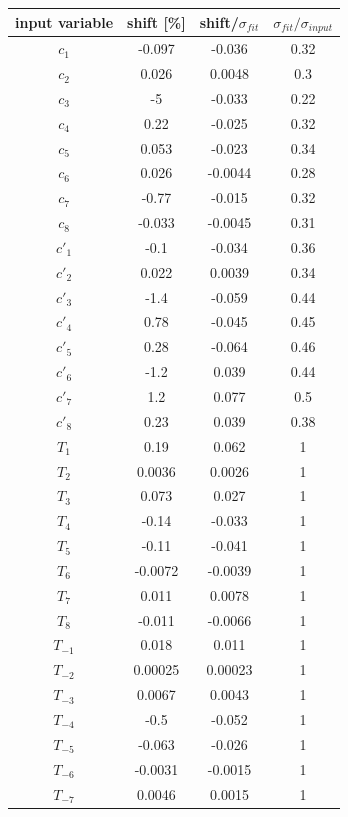 \clearpage
\begin{table}[!h]
	\begin{center}
		\begin{tabular}{c| c| c|c}
			input variable & \quad shift [\%] \quad & shift/$\sigma_{fit}$ & \quad $\sigma_{fit}/ \sigma_{input}$\\
			\hline
			\hline
$c_1$ & -0.097 & -0.036 & 0.32\\ 
$c_2$ & 0.026 & 0.0048 & 0.3\\ 
$c_3$ & -5 & -0.033 & 0.22\\ 
$c_4$ & 0.22 & -0.025 & 0.32\\ 
$c_5$ & 0.053 & -0.023 & 0.34\\ 
$c_6$ & 0.026 & -0.0044 & 0.28\\ 
$c_7$ & -0.77 & -0.015 & 0.32\\ 
$c_8$ & -0.033 & -0.0045 & 0.31\\ 
$c'_1$ & -0.1 & -0.034 & 0.36\\ 
$c'_2$ & 0.022 & 0.0039 & 0.34\\ 
$c'_3$ & -1.4 & -0.059 & 0.44\\ 
$c'_4$ & 0.78 & -0.045 & 0.45\\ 
$c'_5$ & 0.28 & -0.064 & 0.46\\ 
$c'_6$ & -1.2 & 0.039 & 0.44\\ 
$c'_7$ & 1.2 & 0.077 & 0.5\\ 
$c'_8$ & 0.23 & 0.039 & 0.38\\ 
$T_1$ & 0.19 & 0.062 & 1\\ 
$T_2$ & 0.0036 & 0.0026 & 1\\ 
$T_3$ & 0.073 & 0.027 & 1\\ 
$T_4$ & -0.14 & -0.033 & 1\\ 
$T_5$ & -0.11 & -0.041 & 1\\ 
$T_6$ & -0.0072 & -0.0039 & 1\\ 
$T_7$ & 0.011 & 0.0078 & 1\\ 
$T_8$ & -0.011 & -0.0066 & 1\\ 
$T_{-1}$ & 0.018 & 0.011 & 1\\ 
$T_{-2}$ & 0.00025 & 0.00023 & 1\\ 
$T_{-3}$ & 0.0067 & 0.0043 & 1\\ 
$T_{-4}$ & -0.5 & -0.052 & 1\\ 
$T_{-5}$ & -0.063 & -0.026 & 1\\ 
$T_{-6}$ & -0.0031 & -0.0015 & 1\\ 
$T_{-7}$ & 0.0046 & 0.0015 & 1\\ 

\end{tabular}
\end{center}
\end{table}
